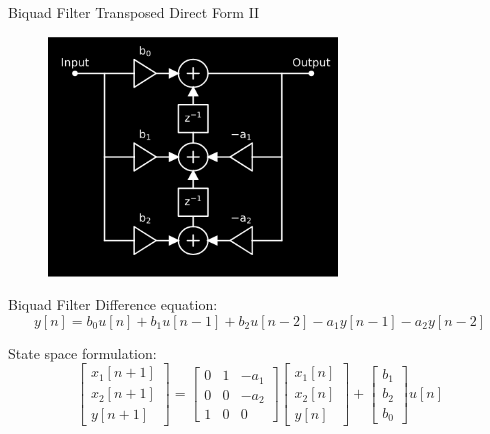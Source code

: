 \begin{frame}
\end{frame}

\begin{frame}{Biquad Filter}
    Transposed Direct Form II
    \begin{figure}
        \includegraphics[height=2.5in]{../NonlinearBiquad/Pics/TDF-II.png}
    \end{figure}
\end{frame}

\begin{frame}{Biquad Filter}
    Difference equation:
    \begin{equation}
        y[n] = b_0 u[n] + b_1 u[n-1]
        + b_2 u[n-2] - a_1 y[n-1]
        - a_2 y[n-2]
    \end{equation}

    State space formulation:
    \begin{equation}
        \begin{bmatrix} x_1[n+1] \\ x_2[n+1] \\ y[n+1] \end{bmatrix} =
        \begin{bmatrix} 0& 1& -a_1\\ 0& 0& -a_2\\ 1& 0& 0 \end{bmatrix}
        \begin{bmatrix} x_1[n] \\ x_2[n] \\ y[n] \end{bmatrix}
        + \begin{bmatrix} b_1\\ b_2\\ b_0 \end{bmatrix} u[n]
    \end{equation}
\end{frame}

